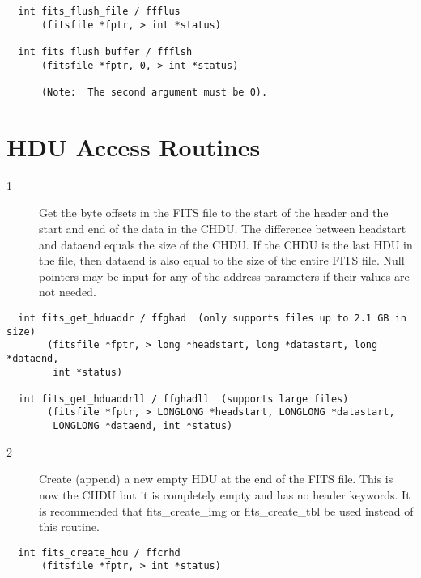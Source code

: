 \documentclass[11pt]{book}
\begin{document}
\begin{verbatim}
  int fits_flush_file / ffflus
      (fitsfile *fptr, > int *status)

  int fits_flush_buffer / ffflsh
      (fitsfile *fptr, 0, > int *status)

      (Note:  The second argument must be 0).
\end{verbatim}


\section{HDU Access Routines}


\begin{description}
\item[1 ] Get the byte offsets in the FITS file to the start of the header
    and the start and end of the data in the CHDU. The difference
    between headstart and dataend equals the size of the CHDU.  If the
    CHDU is the last HDU in the file, then dataend is also equal to the
    size of the entire FITS file.  Null pointers may be input for any
   of the address parameters if their values are not needed. \label{ffghad}
\end{description}

\begin{verbatim}
  int fits_get_hduaddr / ffghad  (only supports files up to 2.1 GB in size)
       (fitsfile *fptr, > long *headstart, long *datastart, long *dataend,
        int *status)

  int fits_get_hduaddrll / ffghadll  (supports large files)
       (fitsfile *fptr, > LONGLONG *headstart, LONGLONG *datastart,
        LONGLONG *dataend, int *status)
\end{verbatim}

\begin{description}
\item[2 ] Create (append) a new empty HDU at the end of the FITS file.
    This is now  the CHDU but it is completely empty and has
    no header keywords.  It is recommended that fits\_create\_img or
 fits\_create\_tbl be used instead of this routine. \label{ffcrhd}
\end{description}

\begin{verbatim}
  int fits_create_hdu / ffcrhd
      (fitsfile *fptr, > int *status)
\end{verbatim}
\end{document}
